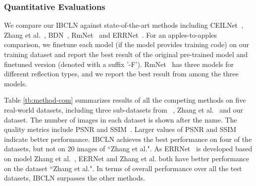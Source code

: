 \documentclass[10pt,twocolumn,letterpaper]{article}
\begin{document}
\subsubsection{Quantitative Evaluations}
We compare our IBCLN against state-of-the-art methods including CEILNet~\cite{fan2017generic}, Zhang et al.~\cite{zhang2018single}, BDN~\cite{yang2018seeing}, RmNet~\cite{wen2019single} and ERRNet~\cite{wei2019single}. For an apples-to-apples comparison, we finetune each model (if the model provides training code) on our training dataset and report the best result of the original pre-trained model and finetuned version (denoted with a suffix ’-F’). RmNet~\cite{wen2019single} has three models for different reflection types, and we report the best result from among the three models.
\begin{table}[!t]
    \centering
    \caption{Ablation study of IBCLN for architecture on three testing sets. w/o  means training with only one sub-network . w/o iteration means the total time steps is 1. Each term contributes to the SIRR performance, and combining all achieves the best results.}
    \footnotesize
    \vspace{2pt}
    \vspace{-1.5em}
    \label{tb:block}
\end{table}

Table \ref{tb:method-com} summarizes results of all the competing methods on five real-world datasets, including three sub-datasets from ~\cite{wan2017benchmarking}, Zhang et al.~\cite{zhang2018single} and our dataset. The number of images in each dataset is shown after the name. The quality metrics include PSNR and SSIM~\cite{wang2004image}. Larger values of PSNR and SSIM indicate better performance. IBCLN achieves the best performance on four of the datasets, but not on 20 images of ``Zhang et al.". As ERRNet~\cite{wei2019single} is developed based on model Zhang et al.~\cite{zhang2018single}, EERNet and Zhang et al. both have better performance on the dataset ``Zhang et al.". In terms of overall performance over all the test datasets, IBCLN surpasses the other methods.
\end{document}
